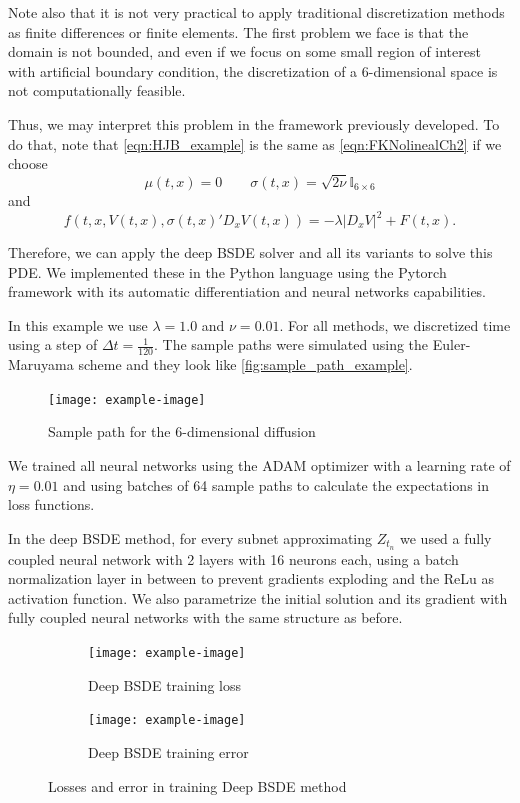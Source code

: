 Note also that it is not very practical to apply traditional discretization methods as finite differences or finite elements. The first problem we face is that the domain is not bounded, and even if we focus on some small region of interest with artificial boundary condition, the discretization of a 6-dimensional space is not computationally feasible.

Thus, we may interpret this problem in the framework previously developed. To do that, note that \eqref{eqn:HJB_example} is the same as \eqref{eqn:FKNolinealCh2} if we choose
\begin{equation}
	\mu(t,x)=0\quad \quad \sigma(t,x)=\sqrt{2\nu} \mathbb{I}_{6\times 6}
\end{equation}
and 
\begin{equation}
	f(t,x,V(t,x),\sigma(t,x)'D_x V(t,x))=-\lambda |D_x V|^2+F(t,x).
\end{equation}

Therefore, we can apply the deep BSDE solver and all its variants to solve this PDE. We implemented these in the Python language using the Pytorch framework with its automatic differentiation and neural networks capabilities.

In this example we use $\lambda=1.0$ and $\nu=0.01$. 
For all methods, we discretized time using a step of $\Delta t=\frac{1}{120}$. The sample paths were simulated using the Euler-Maruyama scheme and they look like \autoref{fig:sample_path_example}.
\begin{figure}[H]
	\centering
	\texttt{[image: example-image]}
	\caption{Sample path for the 6-dimensional diffusion}
	\label{fig:sample_path_example}
\end{figure}



We trained all neural networks using the ADAM optimizer with a learning rate of $\eta=0.01$ and using batches of 64 sample paths to calculate the expectations in loss functions. 

In the deep BSDE method, for every subnet approximating $Z_{t_n}$  we used a fully coupled neural network with 2 layers with 16 neurons each, using a batch normalization layer in between to prevent gradients exploding and the ReLu as activation function. We also parametrize the initial solution and its gradient with fully coupled neural networks with the same structure as before.

\begin{figure}[htb!]		
	\begin{subfigure}{.475\linewidth}
		\texttt{[image: example-image]}
		\caption{Deep BSDE training loss}
		\label{fig:BSDE_loss}
	\end{subfigure}\hfill %
	\begin{subfigure}{.475\linewidth}
		\texttt{[image: example-image]}
		\caption{Deep BSDE training error}
		\label{fig:BSDE_error}
	\end{subfigure}
	\caption{Losses and error in training Deep BSDE method }
	\label{fig:deep_BSDE_training}
\end{figure}


